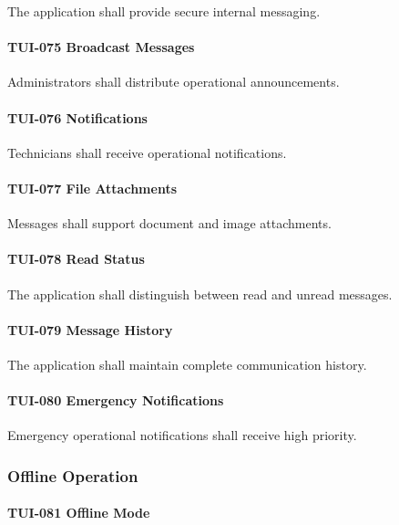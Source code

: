 The application shall provide secure internal messaging.

\paragraph{TUI-075 Broadcast Messages}

Administrators shall distribute operational announcements.

\paragraph{TUI-076 Notifications}

Technicians shall receive operational notifications.

\paragraph{TUI-077 File Attachments}

Messages shall support document and image attachments.

\paragraph{TUI-078 Read Status}

The application shall distinguish between read and unread messages.

\paragraph{TUI-079 Message History}

The application shall maintain complete communication history.

\paragraph{TUI-080 Emergency Notifications}

Emergency operational notifications shall receive high priority.


\subsubsection*{Offline Operation}

\paragraph{TUI-081 Offline Mode}

